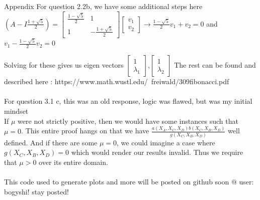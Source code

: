 \documentclass[12pt]{article}
\begin{document}
\begin{section}{Appendix}
	For question 2.2b, we have some additional steps here $(A-I\frac{1+\sqrt{5}}{2}) = $$\begin{bmatrix}
	\frac{1-\sqrt{5}}{2}&1 \\
	1&-\frac{1+\sqrt{5}}{2}
	\end{bmatrix}
	\begin{bmatrix}
	v_1 \\
	v_2
	\end{bmatrix} \rightarrow \frac{1-\sqrt{5}}{2}v_1 + v_2 = 0 $ and $v_1 -\frac{1-\sqrt{5}}{2}v_2 =0$  
	
	Solving for these gives us eigen vectors $\begin{bmatrix}
	1 \\
	\lambda_1
	\end{bmatrix}$,$\begin{bmatrix}
	1 \\
	\lambda_2
	\end{bmatrix}$
	The rest can be found and described here :
	https://www.math.wustl.edu/~freiwald/309fibonacci.pdf
	\\
	\\
	For question 3.1 c, this was an old response, logic was flawed, but was my initial mindset
	\\
	If $\mu$ were not strictly positive, then we would have some instances such that $\mu = 0$. This entire proof hangs on that we have $\frac{a(X_A,X_C,X_D)b(X_C,X_B,X_D)}{g(X_C,X_B,X_D)}$ well defined. And if there are some $\mu = 0$, we could imagine a case where $g(X_C,X_B,X_D) = 0$ which would render our results invalid. Thus we require that $\mu>0$ over its entire domain.
	\\
	\\
	This code used to generate plots and more will be posted on github soon @ user: bogyshi! stay posted!
	
\end{section}
\end{document}
